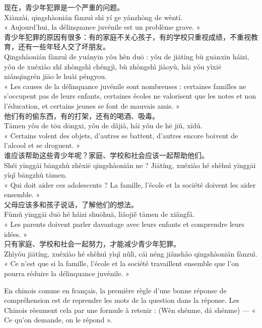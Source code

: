 \documentclass[11pt]{article}
\newcommand{\cle}[1]{{\popxbold\color{popdark}#1}}
\newcounter{popsec}
\newcounter{popsub}
\newcommand{\courssub}[1]{%
  \stepcounter{popsub}%
  \par\vspace{9pt}\noindent{\popxbold\fontsize{11.5}{13}\selectfont\color{popink}{\color{poporange}\thepopsec.\thepopsub}\hspace{6pt}#1}\par\nopagebreak\vspace{4pt}
}
\newcommand{\zh}[1]{\ifmmode\text{#1}\else{#1}\fi}
\begin{document}
\begin{textebox}
现在，青少年犯罪是一个严重的问题。\\
Xiànzài, qīngshàonián fànzuì shì yí ge yánzhòng de wèntí.\\
« Aujourd'hui, la délinquance juvénile est un problème grave. »\\[4pt]
青少年犯罪的原因有很多：有的家庭不关心孩子，有的学校只重视成绩，不重视教育，还有一些年轻人交了坏朋友。\\
Qīngshàonián fànzuì de yuányīn yǒu hěn duō : yǒu de jiātíng bù guānxīn háizi, yǒu de xuéxiào zhǐ zhòngshì chéngjì, bù zhòngshì jiàoyù, hái yǒu yìxiē niánqīngrén jiāo le huài péngyou.\\
« Les causes de la délinquance juvénile sont nombreuses : certaines familles ne s'occupent pas de leurs enfants, certaines écoles ne valorisent que les notes et non l'éducation, et certains jeunes se font de mauvais amis. »\\[4pt]
他们有的偷东西，有的打架，还有的喝酒、吸毒。\\
Tāmen yǒu de tōu dōngxi, yǒu de dǎjià, hái yǒu de hē jiǔ, xīdú.\\
« Certains volent des objets, d'autres se battent, d'autres encore boivent de l'alcool et se droguent. »\\[4pt]
谁应该帮助这些青少年呢？家庭、学校和社会应该一起帮助他们。\\
Shéi yīnggāi bāngzhù zhèxiē qīngshàonián ne ? Jiātíng, xuéxiào hé shèhuì yīnggāi yìqǐ bāngzhù tāmen.\\
« Qui doit aider ces adolescents ? La famille, l'école et la société doivent les aider ensemble. »\\[4pt]
父母应该多和孩子说话，了解他们的想法。\\
Fùmǔ yīnggāi duō hé háizi shuōhuà, liǎojiě tāmen de xiǎngfǎ.\\
« Les parents doivent parler davantage avec leurs enfants et comprendre leurs idées. »\\[4pt]
只有家庭、学校和社会一起努力，才能减少青少年犯罪。\\
Zhǐyǒu jiātíng, xuéxiào hé shèhuì yìqǐ nǔlì, cái néng jiǎnshǎo qīngshàonián fànzuì.\\
« Ce n'est que si la famille, l'école et la société travaillent ensemble que l'on pourra réduire la délinquance juvénile. »
\end{textebox}

\courssub{Méthode : 问什么，答什么}

En chinois comme en français, la première règle d'une bonne réponse de compréhension est de \cle{reprendre les mots de la question} dans la réponse. Les Chinois résument cela par une formule à retenir : \zh{问什么，答什么} (Wèn shénme, dá shénme) — « Ce qu'on demande, on le répond ».
\end{document}
